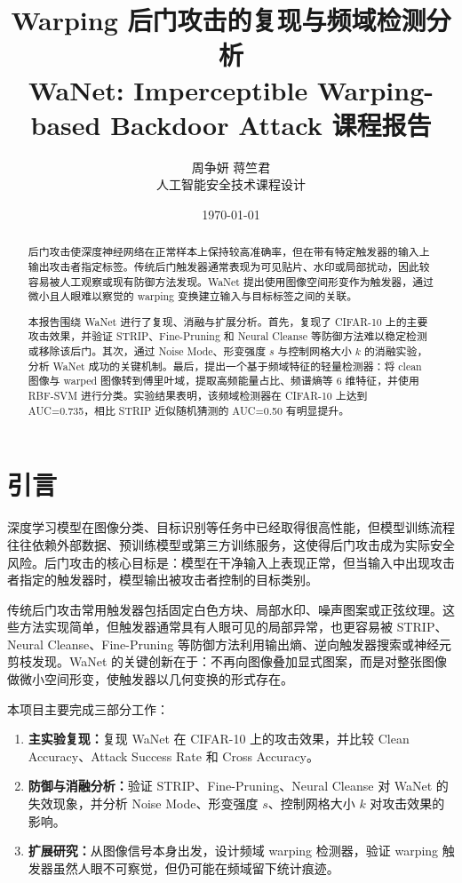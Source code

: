 \documentclass[UTF8,zihao=-4]{ctexart}
\title{\textbf{Warping 后门攻击的复现与频域检测分析}\\
\large WaNet: Imperceptible Warping-based Backdoor Attack 课程报告}
\author{周争妍 \quad 蒋竺君\\
人工智能安全技术课程设计}
\date{\today}
\begin{document}
\maketitle

\begin{abstract}
后门攻击使深度神经网络在正常样本上保持较高准确率，但在带有特定触发器的输入上输出攻击者指定标签。传统后门触发器通常表现为可见贴片、水印或局部扰动，因此较容易被人工观察或现有防御方法发现。WaNet 提出使用图像空间形变作为触发器，通过微小且人眼难以察觉的 warping 变换建立输入与目标标签之间的关联。

本报告围绕 WaNet 进行了复现、消融与扩展分析。首先，复现了 CIFAR-10 上的主要攻击效果，并验证 STRIP、Fine-Pruning 和 Neural Cleanse 等防御方法难以稳定检测或移除该后门。其次，通过 Noise Mode、形变强度 $s$ 与控制网格大小 $k$ 的消融实验，分析 WaNet 成功的关键机制。最后，提出一个基于频域特征的轻量检测器：将 clean 图像与 warped 图像转到傅里叶域，提取高频能量占比、频谱熵等 6 维特征，并使用 RBF-SVM 进行分类。实验结果表明，该频域检测器在 CIFAR-10 上达到 AUC=0.735，相比 STRIP 近似随机猜测的 AUC=0.50 有明显提升。
\end{abstract}

\section{引言}

深度学习模型在图像分类、目标识别等任务中已经取得很高性能，但模型训练流程往往依赖外部数据、预训练模型或第三方训练服务，这使得后门攻击成为实际安全风险。后门攻击的核心目标是：模型在干净输入上表现正常，但当输入中出现攻击者指定的触发器时，模型输出被攻击者控制的目标类别。

传统后门攻击常用触发器包括固定白色方块、局部水印、噪声图案或正弦纹理。这些方法实现简单，但触发器通常具有人眼可见的局部异常，也更容易被 STRIP、Neural Cleanse、Fine-Pruning 等防御方法利用输出熵、逆向触发器搜索或神经元剪枝发现。WaNet 的关键创新在于：不再向图像叠加显式图案，而是对整张图像做微小空间形变，使触发器以几何变换的形式存在。

本项目主要完成三部分工作：
\begin{enumerate}
    \item \textbf{主实验复现：}复现 WaNet 在 CIFAR-10 上的攻击效果，并比较 Clean Accuracy、Attack Success Rate 和 Cross Accuracy。
    \item \textbf{防御与消融分析：}验证 STRIP、Fine-Pruning、Neural Cleanse 对 WaNet 的失效现象，并分析 Noise Mode、形变强度 $s$、控制网格大小 $k$ 对攻击效果的影响。
    \item \textbf{扩展研究：}从图像信号本身出发，设计频域 warping 检测器，验证 warping 触发器虽然人眼不可察觉，但仍可能在频域留下统计痕迹。
\end{enumerate}
\end{document}
